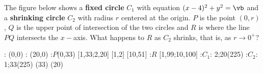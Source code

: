 
\SQUARE\va\vb
\MULTIPLY{}\vc
\MULTIPLY{}\vd
\MULTIPLY{}\ve

\question[4] The figure below shows a \textbf{fixed circle} $C_1$ with equation $(x-\va)^2 + y^2 = \vb$ and a
\textbf{shrinking circle} $C_2$ with radius $r$ centered at the origin. $P$ is the point $(0,r)$, $Q$ is 
the upper point of intersection of the two circles and $R$ is where the line $PQ$ intersects the $x-$axis. What 
happens to $R$ as $C_2$ shrinks, that is, as $r\to 0^+$?

\watchout[-45pt]

  \def\radA{33} %
  \def\radB{20} %
  : (0,0) 
  : (\radB,0)
  :$P$(0,\radA)
   [1,\radA;2,\radB]
   [1,2]
   [10,51]
  :$R$ [1,99;10,100]
   :$C_1$: 2;\radB (225)
   :$C_2$: 1;\radA (225)
\figdrawbegin{}
  (\radA)
  (\radB)
  \figdrawline [10,60]
\figdrawend
{}

\ifprintanswers
  \begin{marginfigure}[-20pt]
    \centerline{\box\figBoxA}
  \end{marginfigure}
\else
  \vspace{1cm}
  \centerline{\box\figBoxA}
\fi

